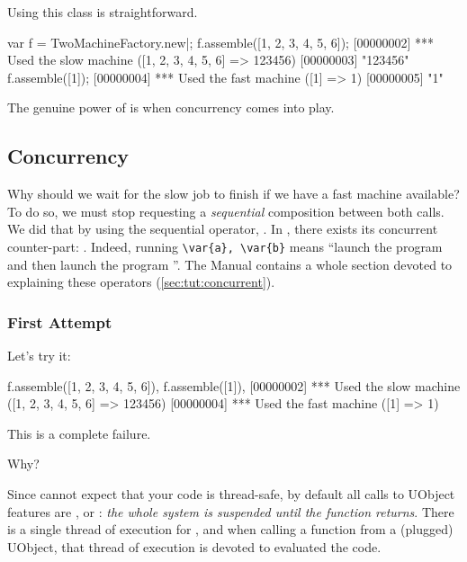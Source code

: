 Using this class is straightforward.

\begin{urbiscript}
var f = TwoMachineFactory.new|;
f.assemble([1, 2, 3, 4, 5, 6]);
[00000002] *** Used the slow machine ([1, 2, 3, 4, 5, 6] => 123456)
[00000003] "123456"
f.assemble([1]);
[00000004] *** Used the fast machine ([1] => 1)
[00000005] "1"
\end{urbiscript}

The genuine power of \us is when concurrency comes into play.

\subsection{Concurrency}
%
%
%

Why should we wait for the slow job to finish if we have a fast machine
available?  To do so, we must stop requesting a \emph{sequential}
composition between both calls.  We did that by using the sequential
operator, \samp{;}.  In \us, there exists its concurrent counter-part:
\samp{,}.  Indeed, running \lstinline|\var{a}, \var{b}| means ``launch the
program  and then launch the program ''.  The \us Manual
contains a whole section devoted to explaining these operators
(\autoref{sec:tut:concurrent}).

\subsubsection{First Attempt}
\label{sec:uob:quick:fst}
Let's try it:

\begin{urbiscript}
f.assemble([1, 2, 3, 4, 5, 6]),
f.assemble([1]),
[00000002] *** Used the slow machine ([1, 2, 3, 4, 5, 6] => 123456)
[00000004] *** Used the fast machine ([1] => 1)
\end{urbiscript}

\noindent
This is a complete failure.

Why?

Since \urbi cannot expect that your code is thread-safe, by default all
calls to UObject features are , or :
\emph{the whole \urbi system is suspended until the function returns}.
There is a single thread of execution for \urbi, and when calling a function
from a (plugged) UObject, that thread of execution is devoted to evaluated
the code.

